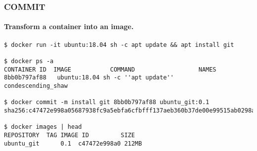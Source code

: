 \begin{frame}[fragile]
\frametitle{COMMIT}
\framesubtitle{Transform a container into an image.}
\scriptsize
\begin{lstlisting}[breaklines=true]
$ docker run -it ubuntu:18.04 sh -c apt update && apt install git

$ docker ps -a
CONTAINER ID  IMAGE           COMMAND                  NAMES
8bb0b797af88   ubuntu:18.04 sh -c ''apt update''       condescending_shaw

$ docker commit -m install git 8bb0b797af88 ubuntu_git:0.1
sha256:c47472e998a05687938fc9a5ebfa6cfbfff137aeb360b37de00e99515ab0298a

$ docker images | head
REPOSITORY  TAG IMAGE ID         SIZE
ubuntu_git      0.1  c47472e998a0 212MB
\end{lstlisting}
\normalsize
\end{frame}